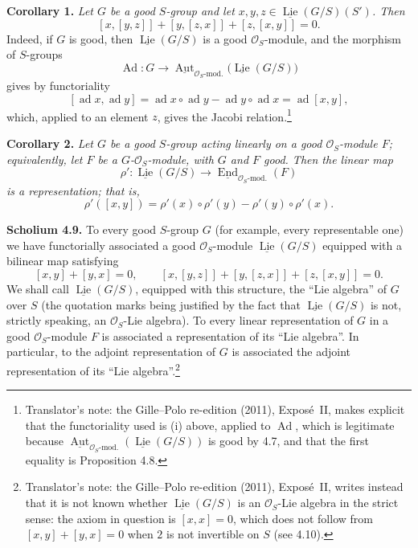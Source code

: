 \medskip
\noindent{}\textbf{Corollary 1.}
\textit{Let \(G\) be a good \(S\)-group and let
\(x,y,z\in\underline{\operatorname{Lie}}(G/S)(S')\). Then}
\[
 [x,[y,z]]+[y,[z,x]]+[z,[x,y]]=0.
\]
Indeed, if \(G\) is good, then \(\underline{\operatorname{Lie}}(G/S)\) is a
good \(\mathcal O_S\)-module, and the morphism of \(S\)-groups
\[
 \operatorname{Ad}:G\longrightarrow
 \underline{\operatorname{Aut}}_{\mathcal O_S\text{-mod.}}
  \bigl(\underline{\operatorname{Lie}}(G/S)\bigr)
\]
gives by functoriality
\[
 [\operatorname{ad}x,\operatorname{ad}y]
 =\operatorname{ad}x\circ\operatorname{ad}y
  -\operatorname{ad}y\circ\operatorname{ad}x
 =\operatorname{ad}[x,y],
\]
which, applied to an element \(z\), gives the Jacobi relation.\footnote{Translator's
note: the Gille--Polo re-edition (2011), Expos\'e~II, makes explicit that
the functoriality used is (i) above, applied to \(\operatorname{Ad}\), which
is legitimate because
\(\underline{\operatorname{Aut}}_{\mathcal O_S\text{-mod.}}(\underline{\operatorname{Lie}}(G/S))\)
is good by 4.7, and that the first equality is Proposition 4.8.}

\medskip
\noindent{}\textbf{Corollary 2.}
\textit{Let \(G\) be a good \(S\)-group acting linearly on a good
\(\mathcal O_S\)-module \(F\); equivalently, let \(F\) be a
\(G\)-\(\mathcal O_S\)-module, with \(G\) and \(F\) good. Then the
linear map}
\[
 \rho':\underline{\operatorname{Lie}}(G/S)
 \longrightarrow
 \underline{\operatorname{End}}_{\mathcal O_S\text{-mod.}}(F)
\]
\textit{is a representation; that is,}
\[
 \rho'([x,y])
 =\rho'(x)\circ\rho'(y)-\rho'(y)\circ\rho'(x).
\]

\medskip
\noindent{}\textbf{Scholium 4.9.}
To every good \(S\)-group \(G\) (for example, every representable
one) we have functorially associated a good \(\mathcal O_S\)-module
\(\underline{\operatorname{Lie}}(G/S)\) equipped with a bilinear map
satisfying
\[
 [x,y]+[y,x]=0,
 \qquad
 [x,[y,z]]+[y,[z,x]]+[z,[x,y]]=0.
\]
We shall call \(\underline{\operatorname{Lie}}(G/S)\), equipped with this
structure, the ``Lie algebra'' of \(G\) over \(S\) (the quotation marks
being justified by the fact that \(\underline{\operatorname{Lie}}(G/S)\)
is not, strictly speaking, an \(\mathcal O_S\)-Lie algebra). To every
linear representation of \(G\) in a good \(\mathcal O_S\)-module \(F\) is
associated a representation of its ``Lie algebra''. In particular, to the
adjoint representation of \(G\) is associated the adjoint representation of
its ``Lie algebra''.\footnote{Translator's note: the Gille--Polo re-edition
(2011), Expos\'e~II, writes instead that it is not known whether
\(\underline{\operatorname{Lie}}(G/S)\) is an \(\mathcal O_S\)-Lie algebra in
the strict sense: the axiom in question is \([x,x]=0\), which does not
follow from \([x,y]+[y,x]=0\) when \(2\) is not invertible on \(S\)
(see 4.10).}

